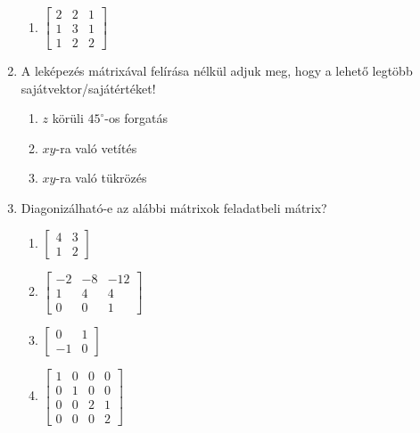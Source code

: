 \documentclass[a4paper, 12pt]{scrartcl}
\begin{document}
\begin{enumerate}
\begin{multicols}{3}
\begin{enumerate}
            \item $\begin{bmatrix}
                      2 & 2 & 1 \\
                      1 & 3 & 1 \\
                      1 & 2 & 2
                    \end{bmatrix}$
          \end{enumerate}
        \end{multicols}
  \item A leképezés mátrixával felírása nélkül adjuk meg, hogy a lehető legtöbb sajátvektor/sajátértéket!
        \begin{enumerate}
          \item $z$ körüli $45^{\circ}$-os forgatás
          \item $xy$-ra való vetítés
          \item $xy$-ra való tükrözés
        \end{enumerate}
  \item Diagonizálható-e az alábbi mátrixok feladatbeli mátrix?
        \begin{multicols}{3}
          \begin{enumerate}
            \item $\begin{bmatrix}
                      4 & 3 \\
                      1 & 2
                    \end{bmatrix}$
            \item $\begin{bmatrix}
                      -2 & -8 & -12 \\
                      1  & 4  & 4   \\
                      0  & 0  & 1
                    \end{bmatrix}$
            \item $\begin{bmatrix}
                      0  & 1 \\
                      -1 & 0
                    \end{bmatrix}$
            \item $\begin{bmatrix}
                      1 & 0 & 0 & 0 \\
                      0 & 1 & 0 & 0 \\
                      0 & 0 & 2 & 1 \\
                      0 & 0 & 0 & 2
                    \end{bmatrix}$


\end{enumerate}
\end{multicols}
\end{enumerate}
\end{document}
